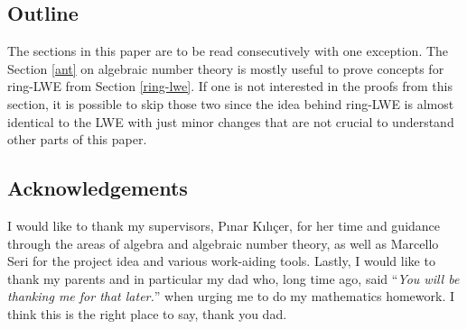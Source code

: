 \iffalse
This bachelor thesis can be seen as a survey on the recent developments in the LBC and improvements in fully homomorphic cryptographic schemes. Nonetheless, there are few minor contributions that we note here.

Firstly, and most importantly, the introduction of many examples that we hope will be of great help for anyone trying to learn and understand LBC schemes. These include comptutations as well as images and tables that help visualize some key concepts related to Gaussian samples or lattices.

Secondly, we present and explicitly state few results that are otherwise left simply as claims or propositions. These mostly include parts on the algebraic number theory for the Section \ref{ring-lwe} on ring-LWE.
\fi

\subsection{Outline}
The sections in this paper are to be read consecutively with one exception. The Section \ref{ant} on algebraic number theory is mostly useful to prove concepts for ring-LWE from Section \ref{ring-lwe}. If one is not interested in the proofs from this section, it is possible to skip those two since the idea behind ring-LWE is almost identical to the LWE with just minor changes that are not crucial to understand other parts of this paper.

\subsection*{Acknowledgements}
I would like to thank my supervisors, Pınar Kılıçer, for her time and guidance through the areas of algebra and algebraic number theory, as well as Marcello Seri for the project idea and various work-aiding tools. Lastly, I would like to thank my parents and in particular my dad who, long time ago, said ``\textit{You will be thanking me for that later.}'' when urging me to do my mathematics homework. I think this is the right place to say, thank you dad.
